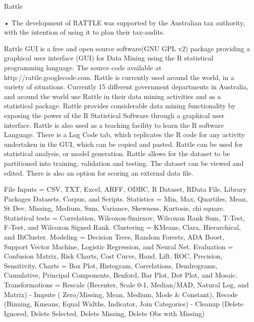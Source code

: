 
Rattle

•	The development of RATTLE was supported by the Australian tax authority, with the intention of using it to plan their tax-audits.

Rattle GUI is a free and open source software(GNU GPL v2) package providing a graphical user interface (GUI) for Data Mining using the R statistical programming language. The source code available at http://rattle.googlecode.com. Rattle is currently used around the world, in a variety of situations. Currently 15 different government departments in Australia, and around the world use Rattle in their data mining activities and as a statistical package.
Rattle provides considerable data mining functionality by exposing the power of the R Statistical Software through a graphical user interface. Rattle is also used as a teaching facility to learn the R software Language. There is a Log Code tab, which replicates the R code for any activity undertaken in the GUI, which can be copied and pasted. Rattle can be used for statistical analysis, or model generation. Rattle allows for the dataset to be partitioned into training, validation and testing. The dataset can be viewed and edited. There is also an option for scoring an external data file.

File Inputs = CSV, TXT, Excel, ARFF, ODBC, R Dataset, RData File, Library Packages Datasets, Corpus, and Scripts.
Statistics = Min, Max, Quartiles, Mean, St Dev, Missing, Medium, Sum, Variance, Skewness, Kurtosis, chi square.
Statistical tests = Correlation, Wilcoxon-Smirnov, Wilcoxon Rank Sum, T-Test, F-Test, and Wilcoxon Signed Rank.
Clustering = KMeans, Clara, Hierarchical, and BiCluster.
Modeling = Decision Trees, Random Forests, ADA Boost, Support Vector Machine, Logistic Regression, and Neural Net.
Evaluation = Confusion Matrix, Risk Charts, Cost Curve, Hand, Lift, ROC, Precision, Sensitivity.
Charts = Box Plot, Histogram, Correlations, Dendrograms, Cumulative, Principal Components, Benford, Bar Plot, Dot Plot, and Mosaic.
Transformations = Rescale (Recenter, Scale 0-1, Median/MAD, Natural Log, and Matrix) - Impute ( Zero/Missing, Mean, Medium, Mode & Constant), Recode (Binning, Kmeans, Equal Widths, Indicator, Join Categories) - Cleanup (Delete Ignored, Delete Selected, Delete Missing, Delete Obs with Missing)
